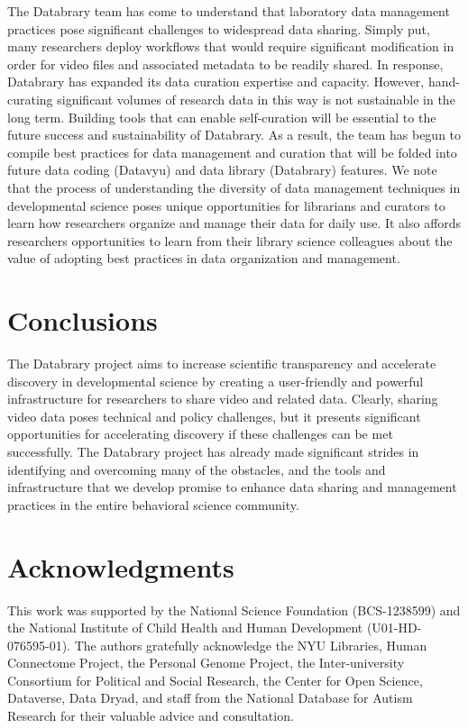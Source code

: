 \documentclass{sig-alternate}
\begin{document}
The Databrary team has come to understand that laboratory data
management practices pose significant challenges to widespread data
sharing. Simply put, many researchers deploy workflows that would
require significant modification in order for video files and associated
metadata to be readily shared. In response, Databrary has expanded its
data curation expertise and capacity. However, hand-curating significant
volumes of research data in this way is not sustainable in the long
term. Building tools that can enable self-curation will be essential to
the future success and sustainability of Databrary. As a result, the
team has begun to compile best practices for data management and
curation that will be folded into future data coding (Datavyu) and data
library (Databrary) features. We note that the process of understanding
the diversity of data management techniques in developmental science
poses unique opportunities for librarians and curators to learn how
researchers organize and manage their data for daily use. It also
affords researchers opportunities to learn from their library science
colleagues about the value of adopting best practices in data
organization and management.

\section{Conclusions}

The Databrary project aims to increase scientific transparency and
accelerate discovery in developmental science by creating a
user-friendly and powerful infrastructure for researchers to share video
and related data. Clearly, sharing video data poses technical and policy
challenges, but it presents significant opportunities for accelerating
discovery if these challenges can be met successfully. The Databrary
project has already made significant strides in identifying and
overcoming many of the obstacles, and the tools and infrastructure that
we develop promise to enhance data sharing and management practices in
the entire behavioral science community.

\section{Acknowledgments}

This work was supported by the National Science Foundation (BCS-1238599)
and the National Institute of Child Health and Human Development
(U01-HD-076595-01). The authors gratefully acknowledge the NYU
Libraries, Human Connectome Project, the Personal Genome Project, the
Inter-university Consortium for Political and Social Research, the
Center for Open Science, Dataverse, Data Dryad, and staff from the
National Database for Autism Research for their valuable advice and
consultation.
\end{document}
